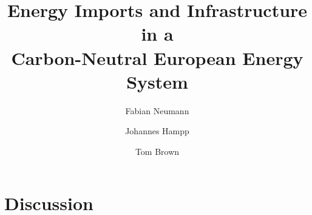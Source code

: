 \documentclass[1p,11pt]{elsarticle}
\begin{document}
\begin{frontmatter}

	\title{Energy Imports and Infrastructure in a\\Carbon-Neutral European Energy System}

	\author[tub]{Fabian Neumann}
	\author[pik]{Johannes Hampp}
	\author[tub]{Tom Brown}

	\address[tub]{Department of Digital Transformation in Energy Systems, Institute of Energy Technology,\\Technische Universität Berlin, Fakultät III, Einsteinufer 25 (TA 8), 10587 Berlin, Germany}
	\address[pik]{Potsdam Institute for Climate Impact Research (PIK), Member of the Leibniz Association, P.O.~Box 60 12 03, 14412 Potsdam, Germany}

	\begin{abstract}
		
	\end{abstract}




\end{frontmatter}









\section*{Discussion}
\label{sec:discussion}
\end{document}
